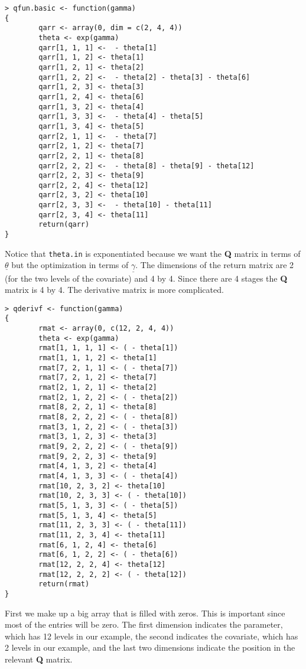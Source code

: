 \documentclass[12pt]{article}
\begin{document}
\begin{verbatim}
> qfun.basic <- function(gamma)
{
        qarr <- array(0, dim = c(2, 4, 4))
        theta <- exp(gamma)
        qarr[1, 1, 1] <-  - theta[1]
        qarr[1, 1, 2] <- theta[1]
        qarr[1, 2, 1] <- theta[2]
        qarr[1, 2, 2] <-  - theta[2] - theta[3] - theta[6]
        qarr[1, 2, 3] <- theta[3]
        qarr[1, 2, 4] <- theta[6]
        qarr[1, 3, 2] <- theta[4]
        qarr[1, 3, 3] <-  - theta[4] - theta[5]
        qarr[1, 3, 4] <- theta[5]
        qarr[2, 1, 1] <-  - theta[7]
        qarr[2, 1, 2] <- theta[7]
        qarr[2, 2, 1] <- theta[8]
        qarr[2, 2, 2] <-  - theta[8] - theta[9] - theta[12]
        qarr[2, 2, 3] <- theta[9]
        qarr[2, 2, 4] <- theta[12]
        qarr[2, 3, 2] <- theta[10]
        qarr[2, 3, 3] <-  - theta[10] - theta[11]
        qarr[2, 3, 4] <- theta[11]
        return(qarr)
}
\end{verbatim}
Notice that \verb+theta.in+ is exponentiated because we want the
{\bf Q} matrix in terms of $\underline{\theta}$ but the optimization
in terms of $\underline{\gamma}$.
The dimensions of the return matrix are 2 (for the two levels of the
covariate) and 4 by 4. Since there are 4 stages the {\bf Q} matrix
is 4 by 4.
The derivative matrix is more complicated.
\begin{verbatim}
> qderivf <- function(gamma)
{
        rmat <- array(0, c(12, 2, 4, 4))
        theta <- exp(gamma)
        rmat[1, 1, 1, 1] <- ( - theta[1])
        rmat[1, 1, 1, 2] <- theta[1]
        rmat[7, 2, 1, 1] <- ( - theta[7])
        rmat[7, 2, 1, 2] <- theta[7]
        rmat[2, 1, 2, 1] <- theta[2]
        rmat[2, 1, 2, 2] <- ( - theta[2])
        rmat[8, 2, 2, 1] <- theta[8]
        rmat[8, 2, 2, 2] <- ( - theta[8])
        rmat[3, 1, 2, 2] <- ( - theta[3])
        rmat[3, 1, 2, 3] <- theta[3]
        rmat[9, 2, 2, 2] <- ( - theta[9])
        rmat[9, 2, 2, 3] <- theta[9]
        rmat[4, 1, 3, 2] <- theta[4]
        rmat[4, 1, 3, 3] <- ( - theta[4])
        rmat[10, 2, 3, 2] <- theta[10]
        rmat[10, 2, 3, 3] <- ( - theta[10])
        rmat[5, 1, 3, 3] <- ( - theta[5])
        rmat[5, 1, 3, 4] <- theta[5]
        rmat[11, 2, 3, 3] <- ( - theta[11])
        rmat[11, 2, 3, 4] <- theta[11]
        rmat[6, 1, 2, 4] <- theta[6]
        rmat[6, 1, 2, 2] <- ( - theta[6])
        rmat[12, 2, 2, 4] <- theta[12]
        rmat[12, 2, 2, 2] <- ( - theta[12])
        return(rmat)
}
\end{verbatim}
First we make up a big array that is filled with zeros. 
This is important since most of the entries will be zero.
The first dimension indicates the parameter, which has 12 levels in our
example, the second indicates the covariate, which has 2 levels in our
example, and the last two dimensions indicate the position in the relevant
{\bf Q} matrix.
\end{document}
